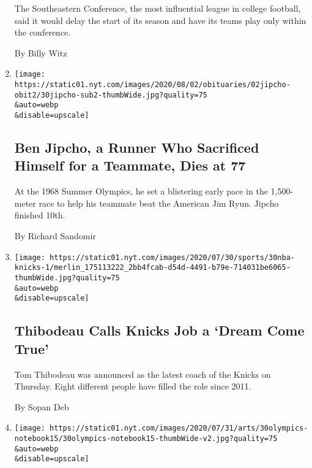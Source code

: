 \begin{enumerate}
  The Southeastern Conference, the most influential league in college
  football, said it would delay the start of its season and have its
  teams play only within the conference.

  By Billy Witz
\item
  \href{/2020/07/30/sports/olympics/ben-jipcho-dead.html}{}

  \texttt{[image: https://static01.nyt.com/images/2020/08/02/obituaries/02jipcho-obit2/30jipcho-sub2-thumbWide.jpg?quality=75\\\&auto=webp\\\&disable=upscale]}

  \hypertarget{ben-jipcho-a-runner-who-sacrificed-himself-for-a-teammate-dies-at-77}{%
  \subsection{Ben Jipcho, a Runner Who Sacrificed Himself for a
  Teammate, Dies at
  77}\label{ben-jipcho-a-runner-who-sacrificed-himself-for-a-teammate-dies-at-77}}

  At the 1968 Summer Olympics, he set a blistering early pace in the
  1,500-meter race to help his teammate beat the American Jim Ryun.
  Jipcho finished 10th.

  By Richard Sandomir
\item
  \href{/2020/07/30/sports/basketball/nba-knicks-coach-tom-thibodeau.html}{}

  \texttt{[image: https://static01.nyt.com/images/2020/07/30/sports/30nba-knicks-1/merlin\_175113222\_2bb4fcab-d54d-4491-b79e-714031be6065-thumbWide.jpg?quality=75\\\&auto=webp\\\&disable=upscale]}

  \hypertarget{thibodeau-calls-knicks-job-a-dream-come-true}{%
  \subsection{Thibodeau Calls Knicks Job a `Dream Come
  True'}\label{thibodeau-calls-knicks-job-a-dream-come-true}}

  Tom Thibodeau was announced as the latest coach of the Knicks on
  Thursday. Eight different people have filled the role since 2011.

  By Sopan Deb
\item
  \href{/2020/07/30/arts/design/tokyo-olympics-1964-design.html}{}

  \texttt{[image: https://static01.nyt.com/images/2020/07/31/arts/30olympics-notebook15/30olympics-notebook15-thumbWide-v2.jpg?quality=75\\\&auto=webp\\\&disable=upscale]}

  \hypertarget{critics-notebook}{%
}
\end{enumerate}
